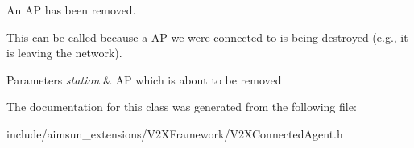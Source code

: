 An AP has been removed. 

This can be called because a AP we were connected to is being destroyed (e.\+g., it is leaving the network).


\begin{DoxyParams}{Parameters}
{\em station} & AP which is about to be removed \\
\hline
\end{DoxyParams}


The documentation for this class was generated from the following file\+:\begin{DoxyCompactItemize}
\item 
include/aimsun\+\_\+extensions/\+V2\+X\+Framework/V2\+X\+Connected\+Agent.\+h\end{DoxyCompactItemize}
